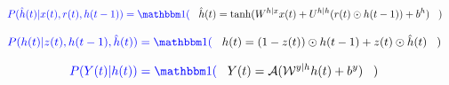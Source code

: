 \begin{align}\color{blue}
P(\hat{h}(t)|x(t), r(t), h(t-1))=
\indi(\;\;\;&
\hat{h}(t) = \tanh(W^{h|x} x(t) +
 U^{h|h} (r(t) \odot h(t-1)) + b^h)
\;\;\;)
\end{align}

\begin{align}\color{blue}
P(h(t)|z(t), h(t-1),\hat{h}(t))=\indi(\;\;\;&
h(t) =  (1 - z(t)) \odot h(t-1) +
 z(t) \odot \hat{h}(t)
\;\;\;)
\end{align}

\begin{align}\color{blue}
P(Y(t)|h(t))=\indi(\;\;\;&
Y(t)= \cala(\calw^{y|h}h(t) + b^y)\;\;\;)
\end{align}